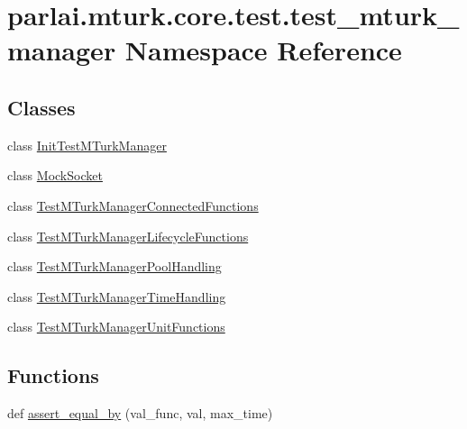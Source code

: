 \hypertarget{namespaceparlai_1_1mturk_1_1core_1_1test_1_1test__mturk__manager}{}\section{parlai.\+mturk.\+core.\+test.\+test\+\_\+mturk\+\_\+manager Namespace Reference}
\label{namespaceparlai_1_1mturk_1_1core_1_1test_1_1test__mturk__manager}
\subsection*{Classes}
\begin{DoxyCompactItemize}
\item 
class \hyperlink{classparlai_1_1mturk_1_1core_1_1test_1_1test__mturk__manager_1_1InitTestMTurkManager}{Init\+Test\+M\+Turk\+Manager}
\item 
class \hyperlink{classparlai_1_1mturk_1_1core_1_1test_1_1test__mturk__manager_1_1MockSocket}{Mock\+Socket}
\item 
class \hyperlink{classparlai_1_1mturk_1_1core_1_1test_1_1test__mturk__manager_1_1TestMTurkManagerConnectedFunctions}{Test\+M\+Turk\+Manager\+Connected\+Functions}
\item 
class \hyperlink{classparlai_1_1mturk_1_1core_1_1test_1_1test__mturk__manager_1_1TestMTurkManagerLifecycleFunctions}{Test\+M\+Turk\+Manager\+Lifecycle\+Functions}
\item 
class \hyperlink{classparlai_1_1mturk_1_1core_1_1test_1_1test__mturk__manager_1_1TestMTurkManagerPoolHandling}{Test\+M\+Turk\+Manager\+Pool\+Handling}
\item 
class \hyperlink{classparlai_1_1mturk_1_1core_1_1test_1_1test__mturk__manager_1_1TestMTurkManagerTimeHandling}{Test\+M\+Turk\+Manager\+Time\+Handling}
\item 
class \hyperlink{classparlai_1_1mturk_1_1core_1_1test_1_1test__mturk__manager_1_1TestMTurkManagerUnitFunctions}{Test\+M\+Turk\+Manager\+Unit\+Functions}
\end{DoxyCompactItemize}
\subsection*{Functions}
\begin{DoxyCompactItemize}
\item 
def \hyperlink{namespaceparlai_1_1mturk_1_1core_1_1test_1_1test__mturk__manager_a1fd7ac4fedefa65d2416601107dbe44c}{assert\+\_\+equal\+\_\+by} (val\+\_\+func, val, max\+\_\+time)
\end{DoxyCompactItemize}
